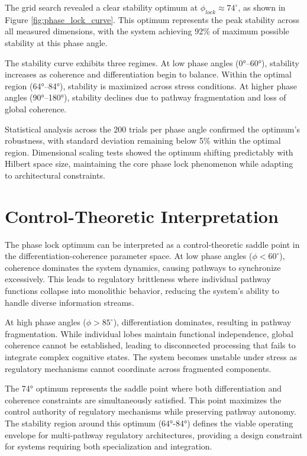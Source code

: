 \documentclass[12pt,a4paper]{article}
\begin{document}
The grid search revealed a clear stability optimum at $\phi_{lock} \approx 74^\circ$, as shown in Figure \ref{fig:phase_lock_curve}. This optimum represents the peak stability across all measured dimensions, with the system achieving 92\% of maximum possible stability at this phase angle.

The stability curve exhibits three regimes. At low phase angles (0°–60°), stability increases as coherence and differentiation begin to balance. Within the optimal region (64°–84°), stability is maximized across stress conditions. At higher phase angles (90°–180°), stability declines due to pathway fragmentation and loss of global coherence.

Statistical analysis across the 200 trials per phase angle confirmed the optimum's robustness, with standard deviation remaining below 5\% within the optimal region. Dimensional scaling tests showed the optimum shifting predictably with Hilbert space size, maintaining the core phase lock phenomenon while adapting to architectural constraints.

\section{Control-Theoretic Interpretation}

The phase lock optimum can be interpreted as a control-theoretic saddle point in the differentiation-coherence parameter space. At low phase angles ($\phi < 60^\circ$), coherence dominates the system dynamics, causing pathways to synchronize excessively. This leads to regulatory brittleness where individual pathway functions collapse into monolithic behavior, reducing the system's ability to handle diverse information streams.

At high phase angles ($\phi > 85^\circ$), differentiation dominates, resulting in pathway fragmentation. While individual lobes maintain functional independence, global coherence cannot be established, leading to disconnected processing that fails to integrate complex cognitive states. The system becomes unstable under stress as regulatory mechanisms cannot coordinate across fragmented components.

The 74° optimum represents the saddle point where both differentiation and coherence constraints are simultaneously satisfied. This point maximizes the control authority of regulatory mechanisms while preserving pathway autonomy. The stability region around this optimum (64°-84°) defines the viable operating envelope for multi-pathway regulatory architectures, providing a design constraint for systems requiring both specialization and integration.
\end{document}
